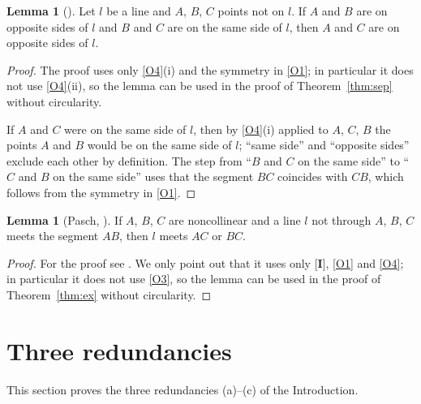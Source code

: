 \documentclass[11pt]{amsart}
\theoremstyle{definition}
\newtheorem{lem}[thm]{Lemma}
\theoremstyle{remark}
\begin{document}
\begin{lem}[{\cite[Chapter~3, p.~77]{Gre}}]\label{lem:iii}
Let $l$ be a line and $A$, $B$, $C$ points not on $l$. If $A$ and $B$ are on opposite sides of $l$ and $B$ and $C$ are on the same side of $l$, then $A$ and $C$ are on opposite sides of $l$.
\end{lem}
\begin{proof}
The proof uses only \ref{O4}(i) and the symmetry in \ref{O1}; in particular it does not use \ref{O4}(ii), so the lemma can be used in the proof of Theorem~\ref{thm:sep} without circularity.

If $A$ and $C$ were on the same side of $l$, then by \ref{O4}(i) applied to $A$, $C$, $B$ the points $A$ and $B$ would be on the same side of $l$; ``same side'' and ``opposite sides'' exclude each other by definition. The step from ``$B$ and $C$ on the same side'' to ``$C$ and $B$ on the same side'' uses that the segment $BC$ coincides with $CB$, which follows from the symmetry in \ref{O1}.
\end{proof}

\begin{lem}[Pasch, {\cite[Pasch's Theorem]{Gre}}]\label{lem:pasch}
If $A$, $B$, $C$ are noncollinear and a line $l$ not through $A$, $B$, $C$ meets the segment $AB$, then $l$ meets $AC$ or $BC$.
\end{lem}
\begin{proof}
For the proof see \cite[Pasch's Theorem]{Gre}. We only point out that it uses only [\textbf{I}], \ref{O1} and \ref{O4}; in particular it does not use \ref{O3}, so the lemma can be used in the proof of Theorem~\ref{thm:ex} without circularity.
\end{proof}

\section{Three redundancies}\label{sec:red}
This section proves the three redundancies (a)–(c) of the Introduction.
\end{document}
